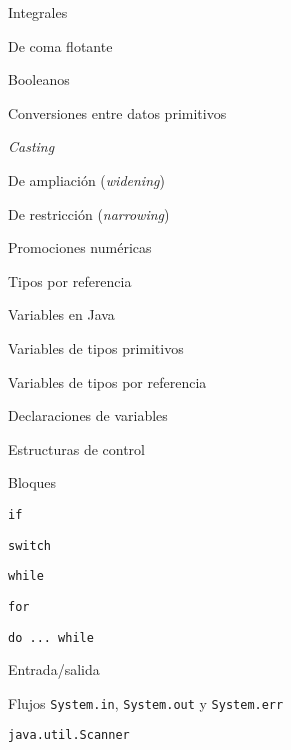 \begin{longenum}
\begin{longenum}
\begin{longenum}
            \begin{longenum}
                \item Integrales
                \item De coma flotante
                \item Booleanos
                \item Conversiones entre datos primitivos
                \begin{longenum}
                    \item \textit{Casting}
                    \item De ampliación (\textit{widening})
                    \item De restricción (\textit{narrowing})
                \end{longenum}
                \item Promociones numéricas
            \end{longenum}
            \item Tipos por referencia
        \end{longenum}
        \item Variables en Java
        \begin{longenum}
            \item Variables de tipos primitivos
            \item Variables de tipos por referencia
            \item Declaraciones de variables
        \end{longenum}
        \item Estructuras de control
        \begin{longenum}
            \item Bloques
            \item \texttt{if}
            \item \texttt{switch}
            \item \texttt{while}
            \item \texttt{for}
            \item \texttt{do ... while}
        \end{longenum}
        \item Entrada/salida
        \begin{longenum}
            \item Flujos \texttt{System.in}, \texttt{System.out} y \texttt{System.err}
            \item \texttt{java.util.Scanner}
        \end{longenum}

\end{longenum}
\end{longenum}
